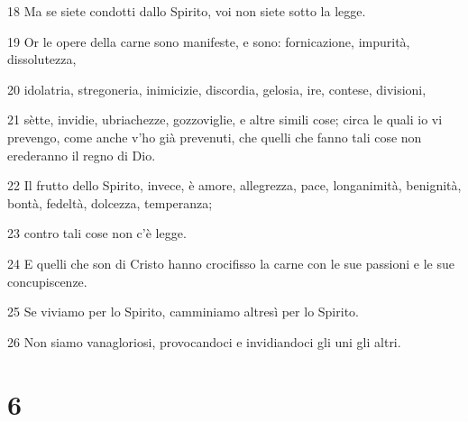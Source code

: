 \par 18 Ma se siete condotti dallo Spirito, voi non siete sotto la legge.
\par 19 Or le opere della carne sono manifeste, e sono: fornicazione, impurità, dissolutezza,
\par 20 idolatria, stregoneria, inimicizie, discordia, gelosia, ire, contese, divisioni,
\par 21 sètte, invidie, ubriachezze, gozzoviglie, e altre simili cose; circa le quali io vi prevengo, come anche v'ho già prevenuti, che quelli che fanno tali cose non erederanno il regno di Dio.
\par 22 Il frutto dello Spirito, invece, è amore, allegrezza, pace, longanimità, benignità, bontà, fedeltà, dolcezza, temperanza;
\par 23 contro tali cose non c'è legge.
\par 24 E quelli che son di Cristo hanno crocifisso la carne con le sue passioni e le sue concupiscenze.
\par 25 Se viviamo per lo Spirito, camminiamo altresì per lo Spirito.
\par 26 Non siamo vanagloriosi, provocandoci e invidiandoci gli uni gli altri.

\chapter{6}

